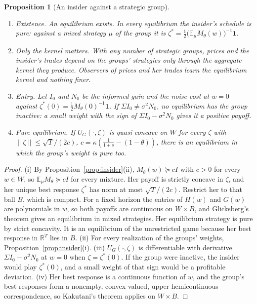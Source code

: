 \documentclass[12pt]{article}
\newtheorem{proposition}[theorem]{Proposition}
\theoremstyle{definition}
\theoremstyle{remark}
\begin{document}
\begin{proposition}[An insider against a strategic group]\label{prop:insidergame}
\begin{enumerate}[label=(\roman*),itemsep=1pt]
\item \emph{Existence.} An equilibrium exists. In every equilibrium the insider's schedule is pure: against a mixed strategy $\mu$ of the group it is $\zeta^*=\frac12\bigl(\mathbb E_\mu M_\theta(w)\bigr)^{-1}\mathbf 1$.
\item \emph{Only the kernel matters.} With any number of strategic groups, prices and the insider's trades depend on the groups' strategies only through the aggregate kernel they produce. Observers of prices and her trades learn the equilibrium kernel and nothing finer.
\item \emph{Entry.} Let $I_0$ and $N_0$ be the informed gain and the noise cost at $w=0$ against $\zeta^*(0)=\frac12M_\theta(0)^{-1}\mathbf 1$. If $\Sigma I_0\ne\sigma^2N_0$, no equilibrium has the group inactive: a small weight with the sign of $\Sigma I_0-\sigma^2N_0$ gives it a positive payoff.
\item \emph{Pure equilibrium.} If $U_G(\cdot,\zeta)$ is quasi-concave on $W$ for every $\zeta$ with $\|\zeta\|\le\sqrt T/(2c)$, $c=\kappa(\frac1{1+s}-(1-\theta))$, there is an equilibrium in which the group's weight is pure too.
\end{enumerate}
\end{proposition}

\begin{proof}
(i) By Proposition~\ref{prop:insider}(ii), $M_\theta(w)\succeq cI$ with $c>0$ for every $w\in W$, so $\mathbb E_\mu M_\theta\succeq cI$ for every mixture. Her payoff is strictly concave in $\zeta$, and her unique best response $\zeta^*$ has norm at most $\sqrt T/(2c)$. Restrict her to that ball $B$, which is compact. For a fixed horizon the entries of $H(w)$ and $G(w)$ are polynomials in $w$, so both payoffs are continuous on $W\times B$, and Glicksberg's theorem \citep{glicksberg1952} gives an equilibrium in mixed strategies. Her equilibrium strategy is pure by strict concavity. It is an equilibrium of the unrestricted game because her best response in $\mathbb R^T$ lies in $B$. (ii) For every realization of the groups' weights, Proposition~\ref{prop:insider}(i). (iii) $U_G(\cdot,\zeta)$ is differentiable with derivative $\Sigma I_0-\sigma^2N_0$ at $w=0$ when $\zeta=\zeta^*(0)$. If the group were inactive, the insider would play $\zeta^*(0)$, and a small weight of that sign would be a profitable deviation. (iv) Her best response is a continuous function of $w$, and the group's best responses form a nonempty, convex-valued, upper hemicontinuous correspondence, so Kakutani's theorem applies on $W\times B$.
\end{proof}
\end{document}
